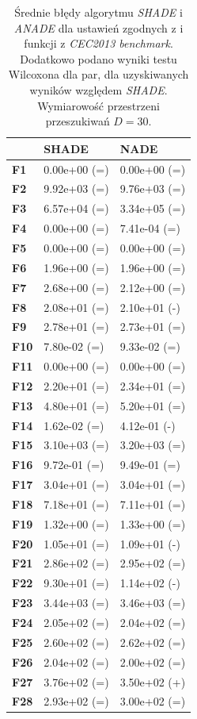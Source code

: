 \documentclass[12pt,a4paper]{report}
\begin{document}
{{{{{{{\begin{table}[h]
\centering
\caption{Średnie błędy algorytmu \emph{SHADE} i \emph{ANADE} dla ustawień zgodnych z \cite{SHADE} i funkcji z \emph{CEC2013 benchmark}. Dodatkowo podano wyniki testu Wilcoxona dla par, dla uzyskiwanych wyników względem \emph{SHADE}. Wymiarowość przestrzeni przeszukiwań $D = 30$.}
\label{Eksp230}
\begin{tabular}{|l|l|l|}
\hline
          & {\bf SHADE}  & {\bf NADE}   \\ \hline
{\bf F1}  & 0.00e+00 (=) & 0.00e+00 (=) \\ \hline
{\bf F2}  & 9.92e+03 (=) & 9.76e+03 (=) \\ \hline
{\bf F3}  & 6.57e+04 (=) & 3.34e+05 (=) \\ \hline
{\bf F4}  & 0.00e+00 (=) & 7.41e-04 (=) \\ \hline
{\bf F5}  & 0.00e+00 (=) & 0.00e+00 (=) \\ \hline
{\bf F6}  & 1.96e+00 (=) & 1.96e+00 (=) \\ \hline
{\bf F7}  & 2.68e+00 (=) & 2.12e+00 (=) \\ \hline
{\bf F8}  & 2.08e+01 (=) & 2.10e+01 (-) \\ \hline
{\bf F9}  & 2.78e+01 (=) & 2.73e+01 (=) \\ \hline
{\bf F10} & 7.80e-02 (=) & 9.33e-02 (=) \\ \hline
{\bf F11} & 0.00e+00 (=) & 0.00e+00 (=) \\ \hline
{\bf F12} & 2.20e+01 (=) & 2.34e+01 (=) \\ \hline
{\bf F13} & 4.80e+01 (=) & 5.20e+01 (=) \\ \hline
{\bf F14} & 1.62e-02 (=) & 4.12e-01 (-) \\ \hline
{\bf F15} & 3.10e+03 (=) & 3.20e+03 (=) \\ \hline
{\bf F16} & 9.72e-01 (=) & 9.49e-01 (=) \\ \hline
{\bf F17} & 3.04e+01 (=) & 3.04e+01 (=) \\ \hline
{\bf F18} & 7.18e+01 (=) & 7.11e+01 (=) \\ \hline
{\bf F19} & 1.32e+00 (=) & 1.33e+00 (=) \\ \hline
{\bf F20} & 1.05e+01 (=) & 1.09e+01 (-) \\ \hline
{\bf F21} & 2.86e+02 (=) & 2.95e+02 (=) \\ \hline
{\bf F22} & 9.30e+01 (=) & 1.14e+02 (-) \\ \hline
{\bf F23} & 3.44e+03 (=) & 3.46e+03 (=) \\ \hline
{\bf F24} & 2.05e+02 (=) & 2.04e+02 (=) \\ \hline
{\bf F25} & 2.60e+02 (=) & 2.62e+02 (=) \\ \hline
{\bf F26} & 2.04e+02 (=) & 2.00e+02 (=) \\ \hline
{\bf F27} & 3.76e+02 (=) & 3.50e+02 (+) \\ \hline
{\bf F28} & 2.93e+02 (=) & 3.00e+02 (=) \\ \hline
\end{tabular}
\end{table}

}}}}}}}
\end{document}

